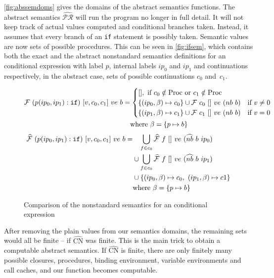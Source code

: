\documentclass[a4paper,halfparskip,DIV=10,11pt]{scrbook}
\newcommand{\F}{\mathcal F}
\newcommand{\aF}{\widehat{\mathcal F}}
\newcommand{\aPR}{\widehat{\mathcal {PR}}}
\begin{document}
\vref{fig:abssemdoms} gives the domains of the abstract semantics functions. The abstract semantics $\aPR$ will run the program no longer in full detail. It will not keep track of actual values computed and conditional branches taken. Instead, it assumes that every branch of an \texttt{if} statement is possibly taken. Semantic values are now sets of possible procedures. This can be seen in \vref{fig:ifsem}, which contains both the exact and the abstract nonstandard semantics definitions for an conditional expression with label $p$, internal labels $ip_0$ and $ip_1$ and continuations respectively, in the abstract case, sets of possible continuations $c_0$ and~$c_1$.

\begin{figure}
\begin{framed}
\begin{align*}
\F\ (p(ip_0,ip_1):\text{\texttt{if}})\ [v,c_0, c_1]\  ve\ b &=
\begin{cases}
[], \text{ if } c_0 \notin \text{Proc} \text{ or } c_1 \notin \text{Proc} \\
\{ (ip_0,\beta) \mapsto c_0 \} \cup \F\ c_0\ []\ ve\ (nb\ b) & \text{if } v \ne 0 \\
\{ (ip_1,\beta) \mapsto c_1 \} \cup \F\ c_1\ []\ ve\ (nb\ b) & \text{if } v = 0 
\end{cases}\\
&\phantom{\strut=}\text{where } \beta = \{ p \mapsto b \}
\end{align*}
\begin{align*}
\aF\ (p(ip_0,ip_1):\text{\texttt{if}})\ [v,c_0, c_1]\  ve\ b &=
\phantom{\cup}\bigcup_{f\in c_0} \aF\ f\ []\ ve\ (\widehat{nb}\ b\ ip_0)\\
&\phantom{\strut=} \cup \bigcup_{f\in c_0} \aF\ f\ []\ ve\ (\widehat{nb}\ b\ ip_1)\\
&\phantom{\strut=} \cup \{ (ip_0, \beta) \mapsto c_0,\ (ip_1, \beta) \mapsto c1\} \\
&\phantom{\strut=}\text{where } \beta = \{ p \mapsto b \}
\end{align*}
\vspace{-1em}
\end{framed}
\caption{Comparison of the nonstandard semantics for an conditional expression}
\label{fig:ifsem}
\end{figure}


After removing the plain values from our semantics domains, the remaining sets would all be finite – if $\widehat{\text{CN}}$ was finite. This is the main trick to obtain a computable abstract semantics. If $\widehat{\text{CN}}$ is finite, there are only finitely many possible closures, procedures, binding environment, variable environments and call caches, and our function becomes computable.
\end{document}
